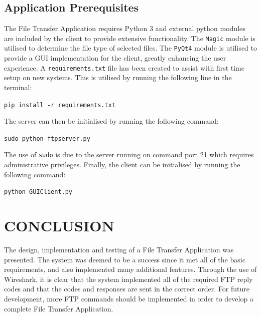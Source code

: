 \documentclass[10pt,twocolumn]{witseiepaper}
\begin{document}
\subsection{Application Prerequisites}
The File Transfer Application requires Python 3 and external python modules are included by the client to provide extensive functionality. The \texttt{Magic} module is utilised  to determine the file type of selected files. The \texttt{PyQt4} module is utilised to provide a GUI implementation for the client, greatly enhancing the user experience. A \texttt{requirements.txt} file has been created to assist with first time setup on new systems. This is utilised by running the following line in the terminal:

\texttt{pip install -r requirements.txt}

The server can then be initialised by running the following command:

\texttt{sudo python ftpserver.py}

The use of \texttt{sudo} is due to the server running on command port 21 which requires administrative privileges. Finally, the client can be initialised by running the following command:

\texttt{python GUIClient.py}

\section{CONCLUSION} \label{sec:conclusion}
The design, implementation and testing of a File Transfer Application was presented. The system was deemed to be a success since it met all of the basic requirements, and also implemented many additional features. Through the use of Wireshark, it is clear that the system implemented all of the required FTP reply codes and that the codes and responses are sent in the correct order. For future development, more FTP commands should be implemented in order to develop a complete File Transfer Application.

%
\balance



\end{document}
